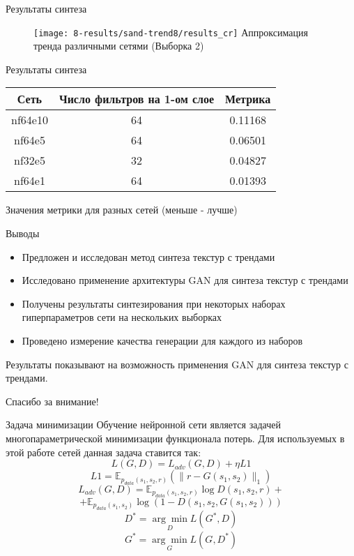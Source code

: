 \documentclass[12pt]{beamer}
\begin{document}
	\begin{frame}{Результаты синтеза}
			\begin{figure}
				\texttt{[image: 8-results/sand-trend8/results\_cr]}
				\vfill
				Аппроксимация тренда различными сетями (Выборка 2)
			\end{figure}
	\end{frame}
	
	\begin{frame}{Результаты синтеза}
		\begin{table}
			\begin{center}
				\begin{tabular}{|c|c|c|}
					\hline
					Сеть & Число фильтров на 1-ом слое & Метрика \\
					\hline
					nf64e10 & 64& 0.11168\\
					\hline
					nf64e5 & 64 & 0.06501\\
					\hline
					nf32e5 & 32 & 0.04827\\
					\hline
					nf64e1 & 64 & 0.01393\\
					\hline
				\end{tabular}
				\vfill
				Значения метрики для разных сетей (меньше - лучше)
			\end{center}
		\end{table}
	\end{frame}
	
	\begin{frame}{Выводы}
		\begin{itemize}
			\item Предложен и исследован метод синтеза текстур с трендами
			\item Исследовано применение архитектуры GAN для синтеза текстур с трендами
			\item Получены результаты синтезирования при некоторых наборах гиперпараметров сети на нескольких выборках
			\item Проведено измерение качества генерации для каждого из наборов
		\end{itemize}
		Результаты показывают на возможность применения GAN для синтеза текстур с трендами.
	\end{frame}
	
	\begin{frame}
		\centering\huge{Спасибо за внимание!}
	\end{frame}
	
	\begin{frame}{Задача минимизации}
		Обучение нейронной сети является задачей многопараметрической минимизации функционала потерь. Для используемых в этой работе сетей данная задача ставится так:
		 $$ L(G, D) = L_{adv}(G, D) + \eta L1$$
		 $$L1 = \mathbb{E}_{p_{data}(s_1, s_2, r)} (\parallel r - G(s_1, s_2) \parallel_1)$$
		 $$ L_{adv}(G, D) = \mathbb{E}_{p_{data}(s_1, s_2, r)}\log D(s_1, s_2, r)+ $$
		 $$ +  \mathbb{E}_{p_{data}(s_1, s_2)} \log (1 - D(s_1, s_2, G(s_1, s_2))) $$
		 $$ D^* = \underset{D}{\arg\min} L(G^*, D)  $$
		 $$ G^* = \underset{G}{\arg\min} L(G, D^*)  $$
	\end{frame}
	
\end{document}
